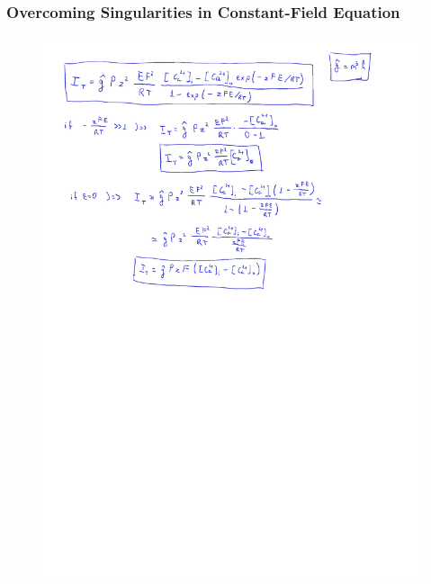\documentclass[../../workflow.tex]{subfiles}
\begin{document}
\subsubsection{Overcoming Singularities in Constant-Field Equation}
\begin{figure}[H]
    \centering
    \includegraphics[height=0.9\textheight, page=1]{Handwritten Notes/R5 Model/Singularities in Constant-Field Equation.pdf}
\end{figure}

\newpage
\end{document}
